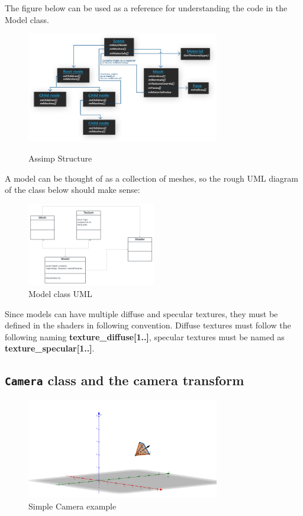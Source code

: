 The figure below can be used as a reference for understanding the code in the Model class.
\begin{figure}[H]
    \centering
    \includegraphics[width=0.75\textwidth]{images/assimp_structure.png}
    \caption{Assimp Structure} \cite{learnopengl}
    \label{fig:assimp_structure}
\end{figure}

A model can be thought of as a collection of meshes, so the rough UML diagram of the class below should make sense:
\begin{figure}[H]
    \centering
    \includegraphics[width=0.5\textwidth]{images/model_uml.png}
    \caption{Model class UML}
    \label{fig:model_uml}
\end{figure}

Since models can have multiple diffuse and specular textures, they must be defined in the shaders in following convention. Diffuse textures must follow the following naming \textbf{texture\_diffuse[1..]}, specular textures must be named as \textbf{texture\_specular[1..]}.


\subsection{\texttt{Camera} class and the camera transform}

\begin{figure}[H]
    \centering
    \includegraphics[width=0.75\textwidth]{images/camera_eg2.png}
    \caption{Simple Camera example}
    \label{fig:camera_eg}
\end{figure}

